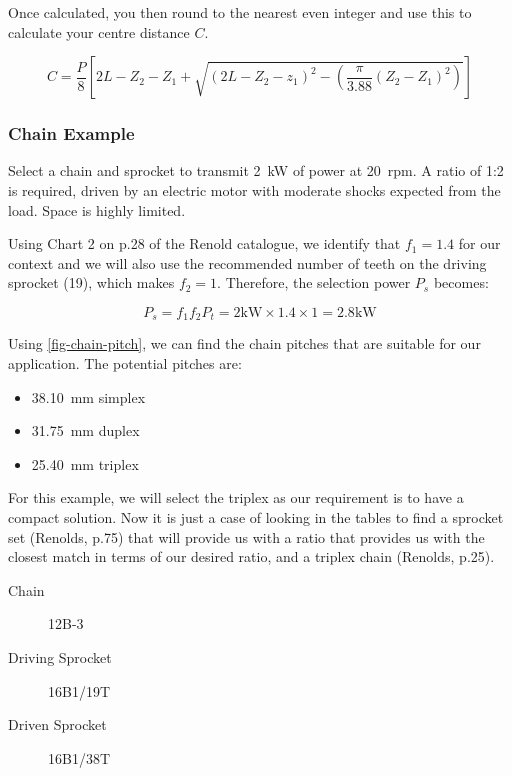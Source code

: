Once calculated, you then round to the nearest even integer and use this to calculate your centre distance \(C\).

\begin{equation}
    C=\frac{P}{8}
    \left[
    2L-Z_2-Z_1 
    +
    \sqrt{ 
    {\left(2L-Z_2-z_1\right)}^2 - \left(\frac{\pi}{3.88}\left(Z_2-Z_1\right)^2\right)
    }
    \right]
\end{equation}

\subsubsection{Chain Example}

Select a chain and sprocket to transmit \SI{2}{\kilo\watt} of power at \SI{20}{rpm}. A ratio of 1:2 is required, driven by an electric motor with moderate shocks expected from the load. Space is highly limited.

Using Chart 2 on p.28 of the Renold catalogue, we identify that \(f_1=1.4\) for our context and we will also use the recommended number of teeth on the driving sprocket (19), which makes \(f_2=1\). Therefore, the selection power \(P_s\) becomes:

\begin{equation}
    P_s = f_1f_2P_t = 2\si{\kilo\watt}\times1.4\times1=2.8\si{\kilo\watt}
\end{equation}

Using \cref{fig-chain-pitch}, we can find the chain pitches that are suitable for our application. The potential pitches are:

\begin{itemize}
    \item \SI{38.10}{\milli\metre} simplex
    \item \SI{31.75}{\milli\metre} duplex
    \item \SI{25.40}{\milli\metre} triplex
\end{itemize}

For this example, we will select the triplex as our requirement is to have a compact solution. Now it is just a case of looking in the tables to find a sprocket set (Renolds, p.75) that will provide us with a ratio that provides us with the closest match in terms of our desired ratio, and a triplex chain (Renolds, p.25).

\begin{description}
    \item[Chain] 12B-3
    \item[Driving Sprocket] 16B1/19T
    \item[Driven Sprocket] 16B1/38T
\end{description}

